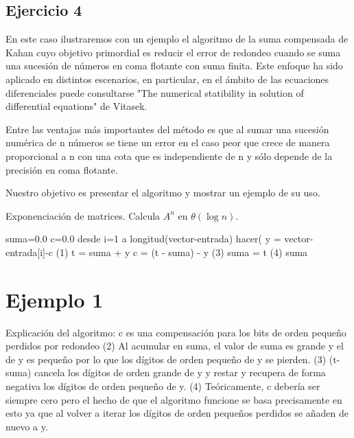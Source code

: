 \documentclass{article}
\theoremstyle{theorem-style}  %
\theoremstyle{definition-style}
\theoremstyle{example-style}
\begin{document}
\subsection{Ejercicio 4} \label{ejtp4}

En este caso ilustraremos con un ejemplo el algoritmo de la suma compensada de Kahan cuyo objetivo primordial es reducir el error de redondeo cuando se suma una sucesión de números en coma flotante con suma finita. Este enfoque ha sido aplicado en distintos escenarios, en particular, en el ámbito de las ecuaciones diferenciales puede consultarse "The numerical statibility in solution of differential equations" de Vitasek. 

Entre las ventajas más importantes del método es que al sumar una sucesión numérica de n números se tiene un error en el caso peor que crece de manera proporcional a n con una cota que es independiente de n y sólo depende de la precisión en coma flotante. 

Nuestro objetivo es presentar el algoritmo y mostrar un ejemplo de su uso.

    \begin{algorithm}
    	\caption{Exponenciación de matrices. Calcula $A^n$ en $\theta(\log n)$.}
    	\label{algo:exp-matrix}
    	\begin{algorithmic}
    		\State suma=0.0
    		\State c=0.0 
    		\For desde i=1 a longitud(vector-entrada) hacer(
    		\State y = vector-entrada[i]-c (1)
    		\State t = suma + y 
    		\State c = (t - suma) - y (3)
    		\State suma = t (4)
    		\EndFor
    		\Return suma
    		\EndFunction
    	\end{algorithmic}
    \end{algorithm}

\section{Ejemplo 1}

 

Explicación del algoritmo:
c es una compensación para los bits de orden pequeño perdidos por redondeo
(2) Al acumular en suma, el valor de suma es grande y el de y es pequeño por lo que los dígitos de orden pequeño de y se pierden. 
(3) (t-suma) cancela los dígitos de orden grande de y y restar y recupera de forma negativa los dígitos de orden pequeño de y. 
(4) Teóricamente, c debería ser siempre cero pero el hecho de que el algoritmo funcione se basa precisamente en esto ya que al volver a iterar los dígitos de orden pequeños perdidos se añaden de nuevo a y. 
\end{document}
